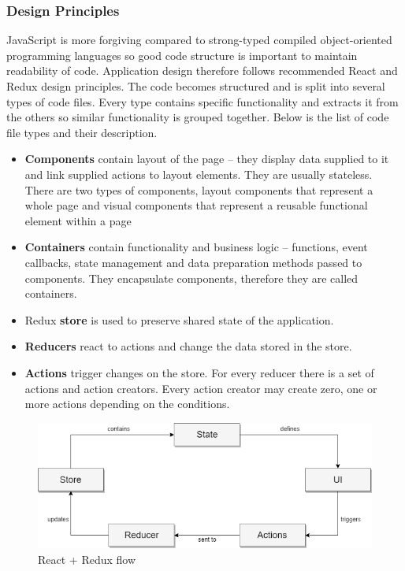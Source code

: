 \subsubsection{Design Principles}

JavaScript is more forgiving compared to strong-typed compiled object-oriented programming languages so good code structure is important to maintain readability of code. Application design therefore follows recommended React and Redux design principles. The code becomes structured and is split into several types of code files. Every type contains specific functionality and extracts it from the others so similar functionality is grouped together. Below is the list of code file types and their description.

\begin{itemize}
    \item \textbf{Components} contain layout of the page – they display data supplied to it and link supplied actions to layout elements. They are usually stateless. There are two types of components, layout components that represent a whole page and visual components that represent a reusable functional element within a page
    \item \textbf{Containers} contain functionality and business logic – functions, event callbacks, state management and data preparation methods passed to components. They encapsulate components, therefore they are called containers. 
    \item Redux \textbf{store} is used to preserve shared state of the application.
    \item \textbf{Reducers} react to actions and change the data stored in the store.
    \item \textbf{Actions} trigger changes on the store. For every reducer there is a set of actions and action creators. Every action creator may create zero, one or more actions depending on the conditions.
\end{itemize}

\begin{figure}[ht]\centering
\includegraphics[width=1.0\textwidth]{img/reactReduxFlow.png}
\caption{React + Redux flow}
\label{fig04:reduxFlow}
\end{figure}


